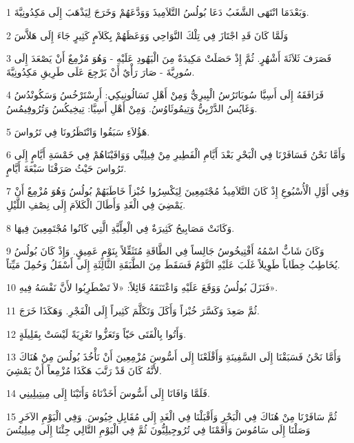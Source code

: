 \par 1 وَبَعْدَمَا انْتَهَى الشَّغَبُ دَعَا بُولُسُ التَّلاَمِيذَ وَوَدَّعَهُمْ وَخَرَجَ لِيَذْهَبَ إِلَى مَكِدُونِيَّةَ.
\par 2 وَلَمَّا كَانَ قَدِ اجْتَازَ فِي تِلْكَ النَّوَاحِي وَوَعَظَهُمْ بِكَلاَمٍ كَثِيرٍ جَاءَ إِلَى هَلاَّسَ
\par 3 فَصَرَفَ ثَلاَثَةَ أَشْهُرٍ. ثُمَّ إِذْ حَصَلَتْ مَكِيدَةٌ مِنَ الْيَهُودِ عَلَيْهِ - وَهُوَ مُزْمِعٌ أَنْ يَصْعَدَ إِلَى سُورِيَّةَ - صَارَ رَأْيٌ أَنْ يَرْجِعَ عَلَى طَرِيقِ مَكِدُونِيَّةَ.
\par 4 فَرَافَقَهُ إِلَى أَسِيَّا سُوبَاتَرُسُ الْبِيرِيُّ وَمِنْ أَهْلِ تَسَالُونِيكِي: أَرِسْتَرْخُسُ وَسَكُونْدُسُ وَغَايُسُ الدَّرْبِيُّ وَتِيمُوثَاوُسُ. وَمِنْ أَهْلِ أَسِيَّا: تِيخِيكُسُ وَتُرُوفِيمُسُ.
\par 5 هَؤُلاَءِ سَبَقُوا وَانْتَظَرُونَا فِي تَرُواسَ.
\par 6 وَأَمَّا نَحْنُ فَسَافَرْنَا فِي الْبَحْرِ بَعْدَ أَيَّامِ الْفَطِيرِ مِنْ فِيلِبِّي وَوَافَيْنَاهُمْ فِي خَمْسَةِ أَيَّامٍ إِلَى تَرُواسَ حَيْثُ صَرَفْنَا سَبْعَةَ أَيَّامٍ.
\par 7 وَفِي أَوَّلِ الْأُسْبُوعِ إِذْ كَانَ التَّلاَمِيذُ مُجْتَمِعِينَ لِيَكْسِرُوا خُبْزاً خَاطَبَهُمْ بُولُسُ وَهُوَ مُزْمِعٌ أَنْ يَمْضِيَ فِي الْغَدِ وَأَطَالَ الْكَلاَمَ إِلَى نِصْفِ اللَّيْلِ.
\par 8 وَكَانَتْ مَصَابِيحُ كَثِيرَةٌ فِي الْعِلِّيَّةِ الَّتِي كَانُوا مُجْتَمِعِينَ فِيهَا.
\par 9 وَكَانَ شَابٌّ اسْمُهُ أَفْتِيخُوسُ جَالِساً فِي الطَّاقَةِ مُتَثَقِّلاً بِنَوْمٍ عَمِيقٍ. وَإِذْ كَانَ بُولُسُ يُخَاطِبُ خِطَاباً طَوِيلاً غَلَبَ عَلَيْهِ النَّوْمُ فَسَقَطَ مِنَ الطَّبَقَةِ الثَّالِثَةِ إِلَى أَسْفَلُ وَحُمِلَ مَيِّتاً.
\par 10 فَنَزَلَ بُولُسُ وَوَقَعَ عَلَيْهِ وَاعْتَنَقَهُ قَائِلاً: «لاَ تَضْطَرِبُوا لأَنَّ نَفْسَهُ فِيهِ».
\par 11 ثُمَّ صَعِدَ وَكَسَّرَ خُبْزاً وَأَكَلَ وَتَكَلَّمَ كَثِيراً إِلَى الْفَجْرِ. وَهَكَذَا خَرَجَ.
\par 12 وَأَتُوا بِالْفَتَى حَيّاً وَتَعَزُّوا تَعْزِيَةً لَيْسَتْ بِقَلِيلَةٍ.
\par 13 وَأَمَّا نَحْنُ فَسَبَقْنَا إِلَى السَّفِينَةِ وَأَقْلَعْنَا إِلَى أَسُّوسَ مُزْمِعِينَ أَنْ نَأْخُذَ بُولُسَ مِنْ هُنَاكَ لأَنَّهُ كَانَ قَدْ رَتَّبَ هَكَذَا مُزْمِعاً أَنْ يَمْشِيَ.
\par 14 فَلَمَّا وَافَانَا إِلَى أَسُّوسَ أَخَذْنَاهُ وَأَتَيْنَا إِلَى مِيتِيلِينِي.
\par 15 ثُمَّ سَافَرْنَا مِنْ هُنَاكَ فِي الْبَحْرِ وَأَقْبَلْنَا فِي الْغَدِ إِلَى مُقَابِلِ خِيُوسَ. وَفِي الْيَوْمِ الآخَرِ وَصَلْنَا إِلَى سَامُوسَ وَأَقَمْنَا فِي تُرُوجِيلِيُّونَ ثُمَّ فِي الْيَوْمِ التَّالِي جِئْنَا إِلَى مِيلِيتُسَ
